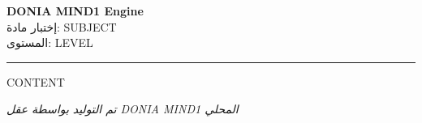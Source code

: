 \documentclass[12pt,a4paper]{article}
\begin{document}
\begin{center}
    \Huge \textbf{DONIA MIND1 Engine} \\
    \vspace{0.5cm}
    \Large إختبار مادة: {{SUBJECT}} \\
    \large المستوى: {{LEVEL}} \\
    \rule{\linewidth}{0.8mm}
\end{center}

\vspace{1cm}

\begin{flushright}
{{CONTENT}}
\end{flushright}

\vspace{2cm}
\begin{center}
    \textit{تم التوليد بواسطة عقل DONIA MIND1 المحلي}
\end{center}
\end{document}
